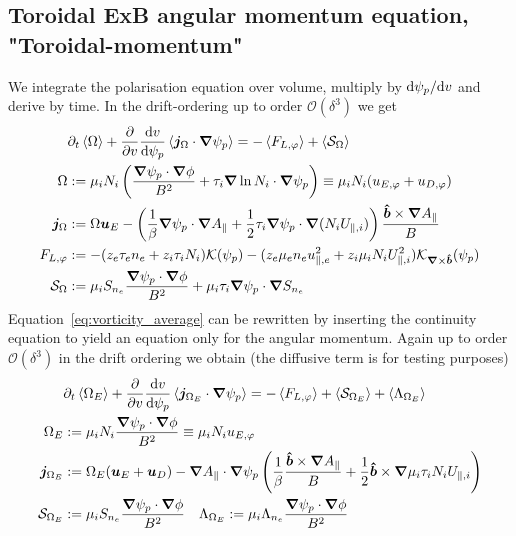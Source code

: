 \subsection{Toroidal ExB angular momentum equation, "Toroidal-momentum"} \label{sec:vorticity_eq}
We integrate the polarisation equation over volume, multiply by $\mathrm{d} \psi_p/\mathrm{d} v$ and derive by time. In the drift-ordering up to order $\mathcal O(\delta^3)$ we get
\begin{align}
    &\partial_t \left \langle \Omega \right \rangle + \frac{\partial}{\partial v}\frac{\mathrm{d} v}{\mathrm{d}\psi_p}\left \langle {\boldsymbol{j}}_\Omega\cdot{\boldsymbol{\nabla}}\psi_p \right \rangle = -\left \langle F_{L,\varphi} \right \rangle + \left \langle \mathcal S_\Omega \right \rangle \label{eq:vorticity_average} \\
\Omega &:= \mu_i N_i \left(\frac{{\boldsymbol{\nabla}}\psi_p\cdot{\boldsymbol{\nabla}}\phi}{B^2} + \tau_i {\boldsymbol{\nabla}}\ln N_i\cdot{\boldsymbol{\nabla}}\psi_p\right) \equiv \mu_i N_i(u_{E,\varphi} + u_{D,\varphi}) \\
{\boldsymbol{j}}_{\Omega} &:= \Omega {\boldsymbol{u}}_E
    - \left(\frac{1}{\beta} {\boldsymbol{\nabla}}\psi_p \cdot{\boldsymbol{\nabla}} A_\parallel +\frac{1}{2}\tau_i {\boldsymbol{\nabla}}\psi_p\cdot{\boldsymbol{\nabla}}  (N_iU_{\parallel,i})\right)\frac{\bm{\hat{b}}\times{\boldsymbol{\nabla}} A_\parallel}{B} \\
    F_{L,\varphi} &:=  -(z_e \tau_e n_e + z_i\tau_i N_i)\mathcal K(\psi_p) - (z_e\mu_e n_eu_{\parallel,e}^2 + z_i\mu_i N_iU_{\parallel,i}^2)\mathcal K_{{\boldsymbol{\nabla}}\times\bm{\hat{b}}}(\psi_p) \\
    \mathcal S_\Omega &:= \mu_i S_{n_e} \frac{{\boldsymbol{\nabla}}\psi_p\cdot{\boldsymbol{\nabla}} \phi}{B^2} + \mu_i\tau_i{\boldsymbol{\nabla}}\psi_p\cdot{\boldsymbol{\nabla}} S_{n_e} \label{eq:em_source}
\end{align}
Equation~\eqref{eq:vorticity_average} can be rewritten by inserting the continuity equation to yield an equation only for the \ExB angular momentum. Again up to order $\mathcal O(\delta^3)$ in the drift ordering we obtain
(the diffusive term is for testing purposes)
\begin{align}
&\partial_t \left \langle \Omega_E \right \rangle + \frac{\partial}{\partial v} \frac{\mathrm{d} v}{\mathrm{d} \psi_p}\left \langle  {\boldsymbol{j}}_{\Omega_E}\cdot{\boldsymbol{\nabla}}\psi_p \right \rangle = -\left \langle F_{L,\varphi} \right \rangle+ \left \langle \mathcal S_{\Omega_E} \right \rangle + \left \langle \Lambda_{\Omega_E} \right \rangle \label{eq:exb_average} \\
\Omega_E &:= \mu_i N_i \frac{{\boldsymbol{\nabla}}\psi_p\cdot{\boldsymbol{\nabla}}\phi}{B^2} \equiv \mu_i N_i u_{E,\varphi} \\
{\boldsymbol{j}}_{\Omega_E} &:= \Omega_E ({\boldsymbol{u}}_E + {\boldsymbol{u}}_D)
    - {\boldsymbol{\nabla}} A_\parallel\cdot{\boldsymbol{\nabla}}\psi_p \left(\frac{1}{\beta} \frac{\bm{\hat{b}}\times{\boldsymbol{\nabla}} A_\parallel}{B} +\frac{1}{2} \bm{\hat{b}} \times {\boldsymbol{\nabla}} \mu_i \tau_i N_iU_{\parallel,i}\right) \\
    \mathcal S_{\Omega_E} &:= \mu_i S_{n_e} \frac{{\boldsymbol{\nabla}}\psi_p\cdot{\boldsymbol{\nabla}}\phi}{B^2} \quad
    \Lambda_{\Omega_E} := \mu_i \Lambda_{n_e}\frac{{\boldsymbol{\nabla}}\psi_p\cdot{\boldsymbol{\nabla}}\phi}{B^2}
\end{align}
